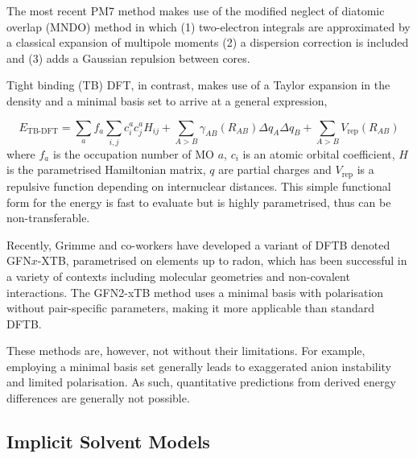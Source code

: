 \documentclass[main.tex]{subfiles}
\begin{document}
The most recent PM7 method makes use of the modified neglect of diatomic overlap (MNDO) method in which (1) two-electron integrals are approximated by a classical expansion of multipole moments (2) a dispersion correction is included and (3) adds a Gaussian repulsion between cores.

Tight binding (TB) DFT, in contrast, makes use of a Taylor expansion in the density and a minimal basis set to arrive at a general expression,

\begin{equation}
	E_\text{TB-DFT} = \sum_a f_a \sum_{i, j} c_i^a c_j^a H_{ij} + \sum_{A > B} \gamma_{AB}(R_{AB}) \Delta q_A \Delta q_B + \sum_{A > B} V_\text{rep}(R_{AB})
\end{equation}
where $f_a$ is the occupation number of MO $a$, $c_i$ is an atomic orbital coefficient, $H$ is the parametrised Hamiltonian matrix, $q$ are partial charges and $V_\text{rep}$ is a repulsive function depending on internuclear distances. This simple functional form for the energy is fast to evaluate but is highly parametrised, thus can be non-transferable.\cite{Gaus2011}


Recently, Grimme and co-workers have developed a variant of DFTB denoted GFN$x$-XTB,\cite{Grimme2017xtb} parametrised on elements up to radon, which has been successful in a variety of contexts including molecular geometries and non-covalent interactions. The GFN2-xTB method uses a minimal basis with polarisation without pair-specific parameters, making it more applicable than standard DFTB.

These methods are, however, not without their limitations. For example, employing a minimal basis set generally leads to exaggerated anion instability and limited polarisation.\cite{Addicoat2014} As such, quantitative predictions from derived energy differences are generally not possible.

\subsection{Implicit Solvent Models}
\end{document}
